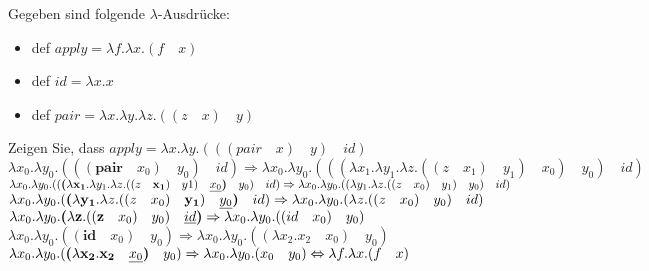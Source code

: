 \begin{card}
  Gegeben sind folgende $\lambda$-Ausdrücke:
  \begin{itemize}
    \item def $apply = \lambda f. \lambda x.(f \quad x)$
    \item def $id = \lambda x.x$
    \item def $pair = \lambda x. \lambda y. \lambda z.((z \quad x ) \quad y)$
  \end{itemize}
  Zeigen Sie, dass $apply = \lambda x.\lambda y.(((pair \quad x) \quad y) \quad id)$
  \hr
  $\lambda x_{0}.\lambda y_{0}.(((\textbf{pair} \quad x_{0}) \quad y_{0}) \quad id) \Rightarrow 
  \lambda x_{0}.\lambda y_{0}.(((\lambda x_{1}. \lambda y_{1}. \lambda z.((z \quad x_{1} ) \quad y_{1}) \quad x_{0}) \quad y_{0}) \quad id)$
  \vfill
  $\lambda x_{0}.\lambda y_{0}.((\textbf{(}\lambda \mathbf{x_{1}}. \lambda y_{1}. \lambda z.((z \quad \mathbf{x_{1}} ) \quad y{1}) \quad \uline{x_{0}} \textbf{)} \quad y_{0}) \quad id) \Rightarrow 
  \lambda x_{0}.\lambda y_{0}.((\lambda y_{1}. \lambda z.((z \quad x_{0} ) \quad y_{1}) \quad y_{0}) \quad id)$
  \vfill
  $\lambda x_{0}.\lambda y_{0}.(\textbf{(} \lambda \mathbf{y_{1}}. \lambda z.((z \quad x_{0} ) \quad \mathbf{y_{1}}) \quad \uline{y_{0}} \textbf{)} \quad id) \Rightarrow
  \lambda x_{0}.\lambda y_{0}.( \lambda z.((z \quad x_{0} ) \quad y_{0}) \quad id)$
  \vfill
  $\lambda x_{0}.\lambda y_{0}.\textbf{(} \lambda \textbf{z}.((\textbf{z} \quad x_{0} ) \quad y_{0})\quad \uline{id} \textbf{)}  \Rightarrow
  \lambda x_{0}.\lambda y_{0}.((id \quad x_{0} ) \quad y_{0})$
  \vfill
  $\lambda x_{0}.\lambda y_{0}.((\textbf{id} \quad x_{0} ) \quad y_{0}) \Rightarrow 
  \lambda x_{0}.\lambda y_{0}.((\lambda x_{2}.x_{2} \quad x_{0} ) \quad y_{0})$
  \vfill
  $\lambda x_{0}.\lambda y_{0}.(\textbf{(}\lambda \mathbf{x_{2}}.\mathbf{x_{2}} \quad \uline{x_{0}} \textbf{)} \quad y_{0}) \Rightarrow 
  \lambda x_{0}.\lambda y_{0}.(x_{0} \quad y_{0}) \Leftrightarrow \lambda f. \lambda x.(f \quad x)$
\end{card}

